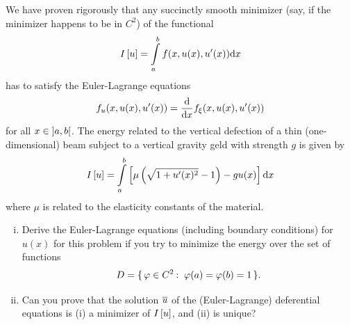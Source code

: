 \documentclass[12pt]{memoir}
\begin{document}
\begin{Ej}
    We have proven rigorously that any succinctly smooth minimizer (say, if the minimizer happens to be in $C^2$) of the functional
    $$I\left\lbrack u\right\rbrack=\int\limits_a^b f(x,u(x),u'(x))\dd x $$
    has to satisfy the Euler-Lagrange equations
    $$f_u(x,u(x),u'(x))=\dv{x}f_\xi(x,u(x),u'(x))$$
    for all $x\in\left\rbrack a,b\right\lbrack$. The energy related to the vertical defection of a thin (one-dimensional) beam subject to a vertical gravity geld with strength $g$ is given by
    $$I\left\lbrack u\right\rbrack=\int\limits_a^b \left\lbrack\mu\left(\sqrt{1+u'(x)^2}-1\right)-gu(x)\right\rbrack\dd x $$
    where $\mu$ is related to the elasticity constants of the material.
    \begin{enumerate}[i)]
        \item Derive the Euler-Lagrange equations (including boundary conditions) for $u(x)$ for this problem if you
        try to minimize the energy over the set of functions
        $$D=\set{\vf\in C^2\:\ \vf(a)=\vf(b)=1}.$$
        \item Can you prove that the solution $\overline u$ of the (Euler-Lagrange) deferential equations is (i) a minimizer of
        $I\left\lbrack u\right\rbrack$, and (ii) is unique?
    \end{enumerate}
\end{Ej}
\end{document}
